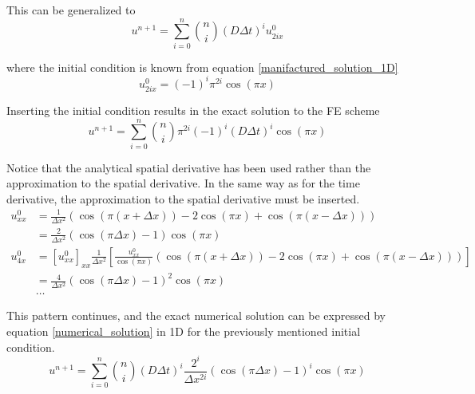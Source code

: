 This can be generalized to 
\begin{equation}
 u^{n+1} = \sum\limits_{i=0}^n {n\choose i}\left(D\Delta t\right)^iu^0_{2ix}
\end{equation}

where the initial condition is known from equation \eqref{manifactured_solution_1D}
\begin{equation*}
 u^0_{2ix} = \left(-1\right)^i\pi^{2i}\cos(\pi x)
\end{equation*}

Inserting the initial condition results in the exact solution to the FE scheme
\begin{equation}
 u^{n+1} = \sum\limits_{i=0}^n {n\choose i}\pi^{2i}\left(-1\right)^i\left(D\Delta t\right)^i\cos(\pi x)
\end{equation}

Notice that the analytical spatial derivative has been used rather than the approximation to the spatial derivative. 
In the same way as for the time derivative, the approximation to the spatial derivative must be inserted. 
\begin{align*}
 u^0_{xx} &= \frac{1}{\Delta x^2}\left(\cos(\pi(x+\Delta x)) -2\cos(\pi x) +\cos(\pi(x-\Delta x))\right) \\
 &= \frac{2}{\Delta x^2}\left(\cos(\pi\Delta x)-1\right)\cos(\pi x)\\
 u^0_{4x} &= [u^0_{xx}]_{xx} \frac{1}{\Delta x^2}\left[\frac{u^0_{xx}}{\cos(\pi x)}\left(\cos(\pi(x+\Delta x)) -2\cos(\pi x) +\cos(\pi(x-\Delta x))\right)\right]\\
 &= \frac{4}{\Delta x^2}\left(\cos(\pi\Delta x)-1\right)^2\cos(\pi x)\\
 &\dots
\end{align*}


This pattern continues, and the exact numerical solution can be expressed by equation \eqref{numerical_solution} in 1D for the previously mentioned initial condition.
\begin{equation}\label{numerical_solution}
  u^{n+1} = \sum\limits_{i=0}^n {n\choose i}\left(D\Delta t\right)^i\frac{2^i}{\Delta x^{2i}}\left(\cos(\pi\Delta x)-1\right)^i\cos(\pi x)
\end{equation}

